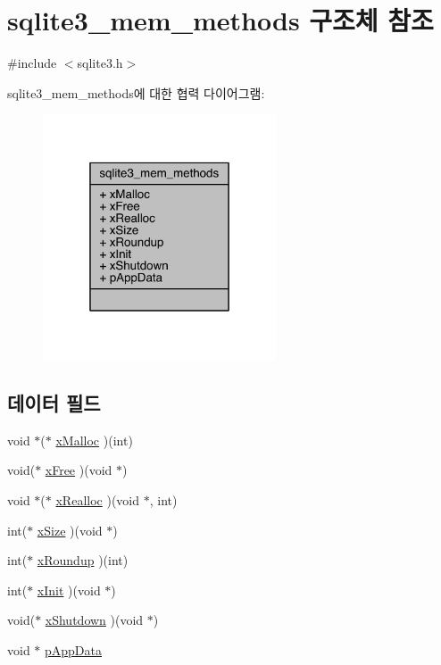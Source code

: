 \hypertarget{structsqlite3__mem__methods}{}\section{sqlite3\+\_\+mem\+\_\+methods 구조체 참조}
\label{structsqlite3__mem__methods}


{\ttfamily \#include $<$sqlite3.\+h$>$}



sqlite3\+\_\+mem\+\_\+methods에 대한 협력 다이어그램\+:
\nopagebreak
\begin{figure}[H]
\begin{center}
\leavevmode
\includegraphics[width=196pt]{d8/daa/structsqlite3__mem__methods__coll__graph}
\end{center}
\end{figure}
\subsection*{데이터 필드}
\begin{DoxyCompactItemize}
\item 
void $\ast$($\ast$ \hyperlink{structsqlite3__mem__methods_a19aee06ad5c1c7041f55725b6adb2b18}{x\+Malloc} )(int)
\item 
void($\ast$ \hyperlink{structsqlite3__mem__methods_a17d4fe3177f86bd7b559ecadaa343ee8}{x\+Free} )(void $\ast$)
\item 
void $\ast$($\ast$ \hyperlink{structsqlite3__mem__methods_a82ef8b50d6b9920c1dadb3257cf36a3a}{x\+Realloc} )(void $\ast$, int)
\item 
int($\ast$ \hyperlink{structsqlite3__mem__methods_a703ec736e9ce21fd43b9602bcd07fa8e}{x\+Size} )(void $\ast$)
\item 
int($\ast$ \hyperlink{structsqlite3__mem__methods_aaf22c6bca12dc6a3f5851e2b6b59835d}{x\+Roundup} )(int)
\item 
int($\ast$ \hyperlink{structsqlite3__mem__methods_a870eddbe27d9062ed2fb49ba13233501}{x\+Init} )(void $\ast$)
\item 
void($\ast$ \hyperlink{structsqlite3__mem__methods_ae3b1f92553e714484515409eefec5c2f}{x\+Shutdown} )(void $\ast$)
\item 
void $\ast$ \hyperlink{structsqlite3__mem__methods_a390f66d08d5a480544e919f64d7713de}{p\+App\+Data}
\end{DoxyCompactItemize}


